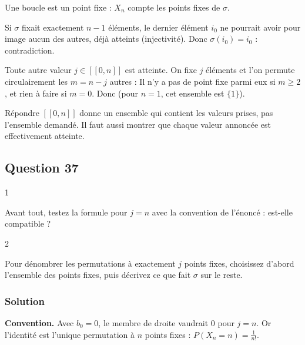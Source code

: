 \documentclass[11pt,a4paper]{article}
\newcommand{\equationajustee}[1]{%
  \sbox{\boiteequation}{$\displaystyle #1$}%
  \ifdim\wd\boiteequation>\linewidth
    \[\resizebox{\linewidth}{!}{\usebox{\boiteequation}}\]%
  \else
    \[#1\]%
  \fi}
\begin{document}
Une boucle est un point fixe : \(X_n\) compte les points fixes de \(\sigma\).

Si \(\sigma\) fixait exactement \(n-1\) éléments, le dernier élément \(i_0\) ne pourrait avoir pour image aucun des autres, déjà atteints (injectivité). Donc \(\sigma(i_0)=i_0\) : contradiction.

Toute autre valeur \(j\in[\![0,n]\!]\) est atteinte. On fixe \(j\) éléments et l'on permute circulairement les \(m=n-j\) autres :
\equationajustee{c_1\to c_2\to\dots\to c_m\to c_1.}
Il n'y a pas de point fixe parmi eux si \(m\ge2\), et rien à faire si \(m=0\). Donc
\equationajustee{\boxed{X_n(\Omega)=[\![0,n]\!]\setminus\{n-1\}}}
(pour \(n=1\), cet ensemble est \(\{1\}\)).

\begin{piege}

Répondre \([\![0,n]\!]\) donne un ensemble qui contient les valeurs prises, pas l'ensemble demandé. Il faut aussi montrer que chaque valeur annoncée est effectivement atteinte.

\end{piege}

\hypertarget{question-37}{%
\subsection{Question 37}\label{question-37}}

\begin{indication}{1}

Avant tout, testez la formule pour \(j=n\) avec la convention de l'énoncé : est-elle compatible ?

\end{indication}

\begin{indication}{2}

Pour dénombrer les permutations à exactement \(j\) points fixes, choisissez d'abord l'ensemble des points fixes, puis décrivez ce que fait \(\sigma\) sur le reste.

\end{indication}

\hypertarget{solution-36}{%
\subsubsection{Solution}\label{solution-36}}

\textbf{Convention.} Avec \(b_0=0\), le membre de droite vaudrait \(0\) pour \(j=n\). Or l'identité est l'unique permutation à \(n\) points fixes : \(P(X_n=n)=\frac1{n!}\).
\end{document}
